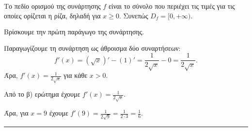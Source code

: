\begin{alist}
    \item Το πεδίο ορισμού της συνάρτησης $f$ είναι το σύνολο που περιέχει τις τιμές για τις οποίες ορίζεται η ρίζα, δηλαδή για $x \ge 0$. Συνεπώς $D_f = [0, +\infty)$.
    
    \item Βρίσκουμε την πρώτη παράγωγο της συνάρτησης.
    
    Παραγωγίζουμε τη συνάρτηση ως άθροισμα δύο συναρτήσεων:
    \[
        f'(x) = (\sqrt{x})' - (1)' = \frac{1}{2\sqrt{x}} - 0 = \frac{1}{2\sqrt{x}}.
    \]
    Άρα, $f'(x) = \frac{1}{2\sqrt{x}}$ για κάθε $x > 0$.
    
    \item Από το β) ερώτημα έχουμε $f'(x) = \frac{1}{2\sqrt{x}}$.
    
    Άρα, για $x=9$ έχουμε $f'(9) = \frac{1}{2\sqrt{9}} = \frac{1}{2 \cdot 3} = \frac{1}{6}$.
\end{alist}
\vspace{6mm}
\noindent\rule{\textwidth}{0.4pt}
\vspace{6mm}

